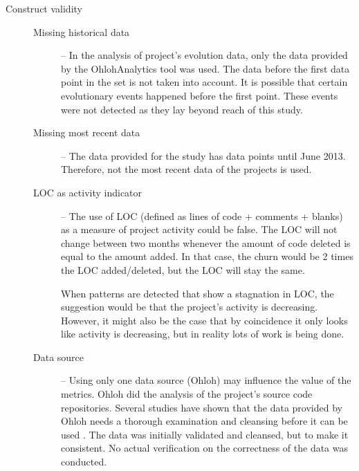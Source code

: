 \begin{description}
	\item[Construct validity] \hfill
	
	\begin{description}
		\item[\rm{Missing historical data}] -- In the analysis of project's
			evolution data, only the data provided by the OhlohAnalytics tool was used.
			The data before the first data point in the set is not taken into account. It
			is possible that certain evolutionary events happened before the first point.
			These events were not detected as they lay beyond reach of this study.

		\item[\rm{Missing most recent data}] -- The data provided for the
			study has data points until June 2013. Therefore, not the most recent data of
			the projects is used.

		\item[\rm{LOC as activity indicator}] -- The use of LOC (defined as
			lines of code + comments + blanks) as a measure of project activity could be
			false. The LOC will not change between two months whenever the amount of code
			deleted is equal to the amount added. In that case, the churn would be 2
			times the LOC added/deleted, but the LOC will stay the same.

			When patterns are detected that show a stagnation in LOC, the suggestion
			would be that the project's activity is decreasing. However, it might also
			be the case that by coincidence it only looks like activity is decreasing,
			but in reality lots of work is being done.

		\item[\rm{Data source}] -- Using only one data source (Ohloh) may
			influence the value of the metrics. Ohloh did the analysis of the project's
			source code repositories. Several studies have shown that the data provided
			by Ohloh needs a thorough examination and cleansing before it can be used
			\cite{bruntink2013, ohlohanalytics, bruntink2014}. The data was initially
			validated and cleansed, but to make it consistent. No actual verification on
			the correctness of the data was conducted.

	\begin{comment}
			Additionally, the data set of projects is a sample taken from all projects
			tracked by Ohloh. What is unclear is if the set of projects tracked by Ohloh
			is a representation of the world of OSS projects. Selecting a data set that
			is representative to the projects tracked by Ohloh does not automatically be
			representative to the world.


\end{comment}
\end{description}
\end{description}
